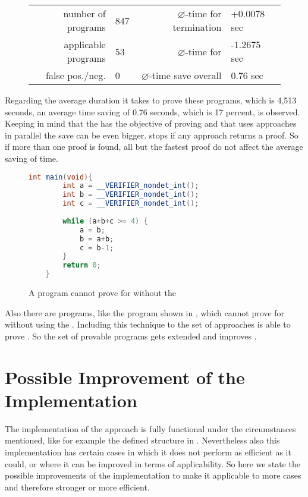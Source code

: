\begin{figure}[H]
	\centering
	\begin{tabular}{rlrl}
		number of programs 	& 847 & $\varnothing$-time for termination & +0.0078 sec \\
		applicable programs & 53 & $\varnothing$-time for \nonterm & -1.2675 sec \\
		false pos./neg. & 0 & $\varnothing$-time save overall & 0.76 sec \\
	\end{tabular}	
\end{figure}

Regarding the average duration it takes \aprove to prove these programs, which is 4,513 seconds, an average time saving of 0.76 seconds, which is 17 percent, is observed. Keeping in mind that the \gnanal has the objective of proving \nonterm and that \aprove uses approaches in parallel the save can be even bigger. \aprove stops if any approach returns a proof. So if more than one proof is found, all but the fastest proof do not affect the average saving of time. \newline

\begin{figure}[H]
	\begin{lstlisting}[language = java]
	int main(void){
		int a = __VERIFIER_nondet_int();
		int b = __VERIFIER_nondet_int();
		int c = __VERIFIER_nondet_int();
		
		while (a+b+c >= 4) {
			a = b;
			b = a+b;
			c = b-1;
		}
		return 0;
	}
	\end{lstlisting}
	\caption{A program \aprove cannot prove \nonterm for without the \gnanal}
	\label{fig:program-newproof}
\end{figure}
Also there are programs, like the program shown in , which \aprove cannot prove \nonterm for without using the \gnanal. Including this technique to the set of approaches \aprove is able to prove \nonterm. So the set of provable programs gets extended and improves \aprove.


\section{Possible Improvement of the Implementation}
The implementation of the approach is fully functional under the circumstances mentioned, like for example the defined structure in . Nevertheless also this implementation has certain cases in which it does not perform as efficient as it could, or where it can be improved in terms of applicability.
So here we state the possible improvements of the implementation to make it applicable to more cases and therefore stronger or more efficient.
